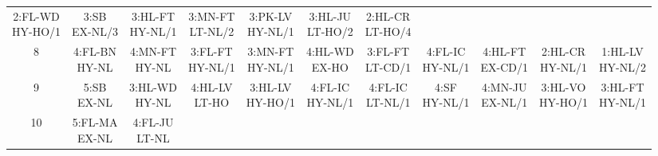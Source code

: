 \begin{table}[htbp]
{\begin{minipage}{0.9\textwidth}
\begin{tabular}{c|cccccccccc}
    \parbox{\cellwidth}{2:FL-WD\\HY-HO/1} & 
    \parbox{\cellwidth}{3:SB\\EX-NL/3} & 
    \parbox{\cellwidth}{3:HL-FT\\HY-NL/1} & 
    \parbox{\cellwidth}{3:MN-FT\\LT-NL/2} & 
    \parbox{\cellwidth}{3:PK-LV\\HY-NL/1} & 
    \parbox{\cellwidth}{3:HL-JU\\LT-HO/2} & 
    \parbox{\cellwidth}{2:HL-CR\\LT-HO/4}\\[\extralinespace]
    8 & 
    \parbox{\cellwidth}{4:FL-BN\\HY-NL} & 
    \parbox{\cellwidth}{4:MN-FT\\HY-NL} & 
    \parbox{\cellwidth}{3:FL-FT\\HY-NL/1} & 
    \parbox{\cellwidth}{3:MN-FT\\HY-NL/1} & 
    \parbox{\cellwidth}{4:HL-WD\\EX-HO} & 
    \parbox{\cellwidth}{3:FL-FT\\LT-CD/1} & 
    \parbox{\cellwidth}{4:FL-IC\\HY-NL/1} & 
    \parbox{\cellwidth}{4:HL-FT\\EX-CD/1} & 
    \parbox{\cellwidth}{2:HL-CR\\HY-NL/1} & 
    \parbox{\cellwidth}{1:HL-LV\\HY-NL/2}\\[\extralinespace]
    9 & 
    \parbox{\cellwidth}{5:SB\\EX-NL} & 
    \parbox{\cellwidth}{3:HL-WD\\HY-NL} & 
    \parbox{\cellwidth}{4:HL-LV\\LT-HO} & 
    \parbox{\cellwidth}{3:HL-LV\\HY-HO/1} & 
    \parbox{\cellwidth}{4:FL-IC\\HY-NL/1} & 
    \parbox{\cellwidth}{4:FL-IC\\LT-NL/1} & 
    \parbox{\cellwidth}{4:SF\\HY-NL/1} & 
    \parbox{\cellwidth}{4:MN-JU\\EX-NL/1} & 
    \parbox{\cellwidth}{3:HL-VO\\HY-HO/1} & 
    \parbox{\cellwidth}{3:HL-FT\\HY-NL/1}\\[\extralinespace]
    10 & 
    \parbox{\cellwidth}{5:FL-MA\\EX-NL} & 
    \parbox{\cellwidth}{4:FL-JU\\LT-NL} & 

\end{tabular}
\end{minipage}}
\end{table}
